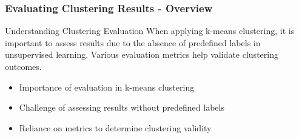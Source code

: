 \documentclass[aspectratio=169]{beamer}
\begin{document}
\begin{frame}[fragile]
    \frametitle{Evaluating Clustering Results - Overview}
    \begin{block}{Understanding Clustering Evaluation}
        When applying k-means clustering, it is important to assess results due to the absence of predefined labels in unsupervised learning. Various evaluation metrics help validate clustering outcomes.
    \end{block}
    
    \begin{itemize}
        \item Importance of evaluation in k-means clustering
        \item Challenge of assessing results without predefined labels
        \item Reliance on metrics to determine clustering validity
    \end{itemize}
\end{frame}
\end{document}
